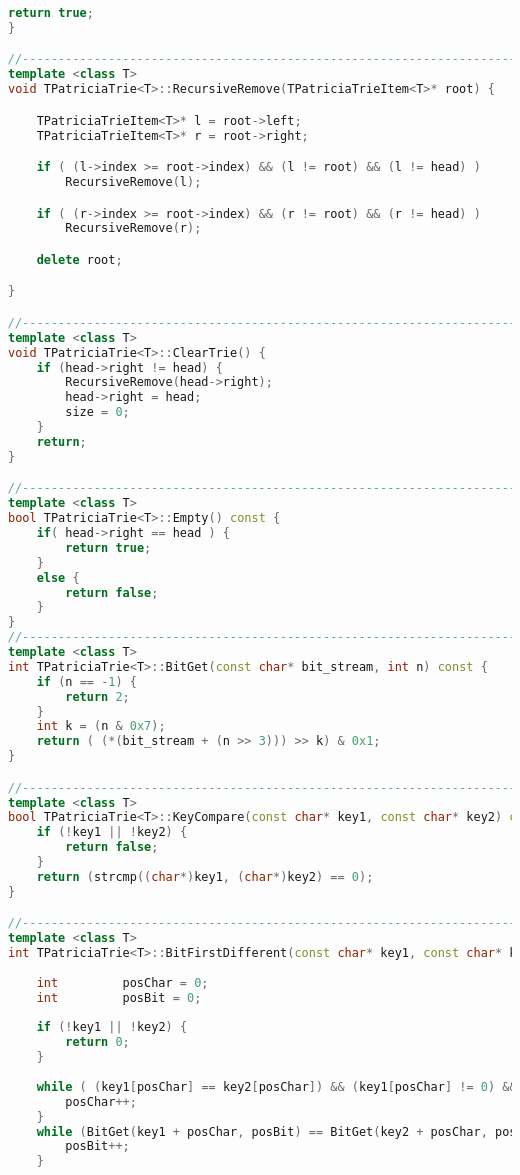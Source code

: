 \begin{lstlisting}[language=C++]
    return true;
}

//----------------------------------------------------------------------------
template <class T>
void TPatriciaTrie<T>::RecursiveRemove(TPatriciaTrieItem<T>* root) {

    TPatriciaTrieItem<T>* l = root->left;
    TPatriciaTrieItem<T>* r = root->right;

    if ( (l->index >= root->index) && (l != root) && (l != head) )
        RecursiveRemove(l);

    if ( (r->index >= root->index) && (r != root) && (r != head) )
        RecursiveRemove(r);

    delete root;

}

//----------------------------------------------------------------------------
template <class T>
void TPatriciaTrie<T>::ClearTrie() {
    if (head->right != head) {
        RecursiveRemove(head->right);
        head->right = head;
        size = 0;
    }
    return;
}

//----------------------------------------------------------------------------
template <class T>
bool TPatriciaTrie<T>::Empty() const {
    if( head->right == head ) {
        return true;
    }
    else {
        return false;
    }
}
//----------------------------------------------------------------------------
template <class T>
int TPatriciaTrie<T>::BitGet(const char* bit_stream, int n) const {
    if (n == -1) {
        return 2;
    }
    int k = (n & 0x7);
    return ( (*(bit_stream + (n >> 3))) >> k) & 0x1;
}

//----------------------------------------------------------------------------
template <class T>
bool TPatriciaTrie<T>::KeyCompare(const char* key1, const char* key2) const {
    if (!key1 || !key2) {
        return false;
    }
    return (strcmp((char*)key1, (char*)key2) == 0);
}

//----------------------------------------------------------------------------
template <class T>
int TPatriciaTrie<T>::BitFirstDifferent(const char* key1, const char* key2) const {
    
    int         posChar = 0;
    int         posBit = 0;
    
    if (!key1 || !key2) {
        return 0;
    }
    
    while ( (key1[posChar] == key2[posChar]) && (key1[posChar] != 0) && (key2[posChar] != 0) ) {
        posChar++;
    }
    while (BitGet(key1 + posChar, posBit) == BitGet(key2 + posChar, posBit)) {
        posBit++;
    }
    

\end{lstlisting}
